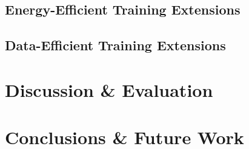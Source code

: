 \documentclass[a4paper, 11pt]{report}
\begin{document}
    \section{Energy-Efficient Training Extensions}
    \label{section: energy-extensions}

    \section{Data-Efficient Training Extensions}
    \label{section: data-extensions}


    \newpage
    \chapter{Discussion \& Evaluation}
    \label{chapter: evaluation}

    \newpage
    \chapter{Conclusions \& Future Work}
    \label{chapter: conclusion}



    \newpage
    
\end{document}
